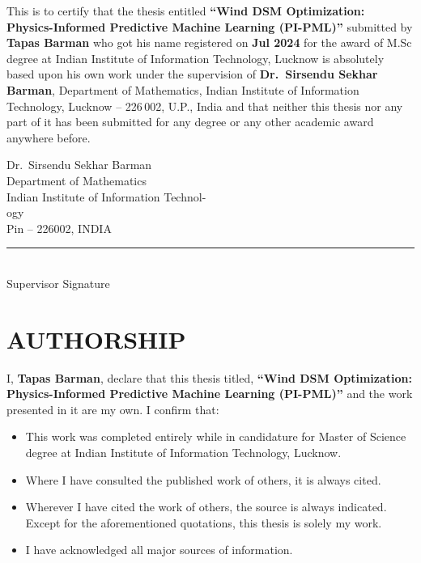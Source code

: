 \documentclass[12pt,a4paper]{report}
\begin{document}
\noindent This is to certify that the thesis entitled
\textbf{``Wind DSM Optimization: Physics-Informed Predictive Machine Learning (PI-PML)''}
submitted by \textbf{Tapas Barman} who got his name registered on \textbf{Jul 2024} for
the award of M.Sc degree at Indian Institute of Information Technology, Lucknow is
absolutely based upon his own work under the supervision of
\textbf{Dr.\ Sirsendu Sekhar Barman}, Department of Mathematics, Indian Institute of
Information Technology, Lucknow -- 226\,002, U.P., India and that neither this thesis nor
any part of it has been submitted for any degree or any other academic award anywhere before.

\vspace{3.5cm}

\noindent
\begin{minipage}[t]{0.5\textwidth}
  Dr.\ Sirsendu Sekhar Barman\\
  Department of Mathematics\\
  Indian Institute of Information Technol-\\
  ogy\\
  Pin -- 226002, INDIA
\end{minipage}%
\hfill
\begin{minipage}[t]{0.42\textwidth}
  \vspace{0pt}
  \rule{6cm}{0.4pt}\\[0.15cm]
  \hfill Supervisor Signature
\end{minipage}

\newpage

\thispagestyle{plain}

\chapter*{\Huge\bfseries AUTHORSHIP}

\noindent I, \textbf{Tapas Barman}, declare that this thesis titled,
\textbf{``Wind DSM Optimization: Physics-Informed Predictive Machine Learning (PI-PML)''}
and the work presented in it are my own. I confirm that:

\vspace{0.5cm}

\begin{itemize}[leftmargin=1.5em, itemsep=0.5em]
  \item This work was completed entirely while in candidature for Master of Science
        degree at Indian Institute of Information Technology, Lucknow.
  \item Where I have consulted the published work of others, it is always cited.
  \item Wherever I have cited the work of others, the source is always indicated. Except
        for the aforementioned quotations, this thesis is solely my work.
  \item I have acknowledged all major sources of information.
\end{itemize}
\end{document}
